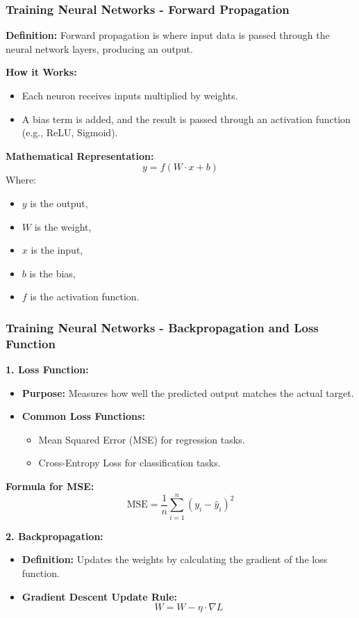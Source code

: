 \documentclass[aspectratio=169]{beamer}
\begin{document}
\begin{frame}[fragile]
    \frametitle{Training Neural Networks - Forward Propagation}
    \textbf{Definition:} Forward propagation is where input data is passed through the neural network layers, producing an output.

    \textbf{How it Works:}
    \begin{itemize}
        \item Each neuron receives inputs multiplied by weights.
        \item A bias term is added, and the result is passed through an activation function (e.g., ReLU, Sigmoid).
    \end{itemize}

    \textbf{Mathematical Representation:}
    \begin{equation}
        y = f(W \cdot x + b)
    \end{equation}
    Where:
    \begin{itemize}
        \item \(y\) is the output,
        \item \(W\) is the weight,
        \item \(x\) is the input,
        \item \(b\) is the bias,
        \item \(f\) is the activation function.
    \end{itemize}
\end{frame}

\begin{frame}[fragile]
    \frametitle{Training Neural Networks - Backpropagation and Loss Function}
    \textbf{1. Loss Function:}
    \begin{itemize}
        \item \textbf{Purpose:} Measures how well the predicted output matches the actual target.
        \item \textbf{Common Loss Functions:}
            \begin{itemize}
                \item Mean Squared Error (MSE) for regression tasks.
                \item Cross-Entropy Loss for classification tasks.
            \end{itemize}
    \end{itemize}

    \textbf{Formula for MSE:}
    \begin{equation}
        \text{MSE} = \frac{1}{n} \sum_{i=1}^{n} (y_i - \hat{y}_i)^2
    \end{equation}

    \textbf{2. Backpropagation:}
    \begin{itemize}
        \item \textbf{Definition:} Updates the weights by calculating the gradient of the loss function.
        \item \textbf{Gradient Descent Update Rule:}
        \begin{equation}
            W = W - \eta \cdot \nabla L
        \end{equation}
    \end{itemize}
\end{frame}
\end{document}
